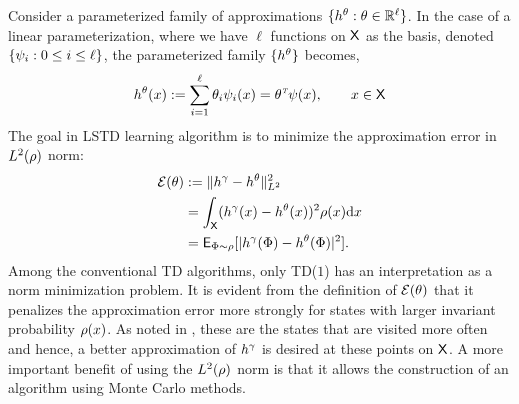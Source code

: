 Consider a parameterized family of approximations $\{h^\theta : \theta \in \mathbb{R}^\ell\}$. In the case of a linear parameterization, where we have $\ell$ functions on ${\sf X}$ as the basis, denoted $\{\psi_i : 0 \leq i \leq \ell\}$, the parameterized family $\{h^\theta\}$ becomes,
\begin{equation}
h^\param(x) := \sum_{i=1}^\ell \param_i \basis_i(x) = \param^\transpose \basis(x), \qquad x \in \state
\label{e:linear_param}
\end{equation}
The goal in LSTD learning algorithm is to minimize the approximation error in $L^2(\rho)$ norm:
\begin{equation}
\begin{aligned}
\error(\param) &:=  \| h^\discount - h^\param \|^2_{L^2} \\
& = \int_\state (h^\discount(x) - h^\param(x))^2 \pr(x) \ud x \\
& = \Expect_{\markovstate \sim \pr} [|h^\discount(\markovstate) - h^\param(\markovstate)|^2].
\label{e:h_norm_error}
\end{aligned}
\end{equation}
Among the conventional TD algorithms, only TD($1$) has an interpretation as a norm minimization problem. It is evident from the definition of $\mathcal{E}(\theta)$ that it penalizes the approximation error more strongly for states with larger invariant probability $\rho(x)$. As noted in \cite{ctcn}, these are the states that are visited more often and hence, a better approximation of $h^\gamma$ is desired at these points on ${\sf X}$. A more important benefit of using the $L^2(\rho)$ norm is that it allows the construction of an algorithm using Monte Carlo methods. 

